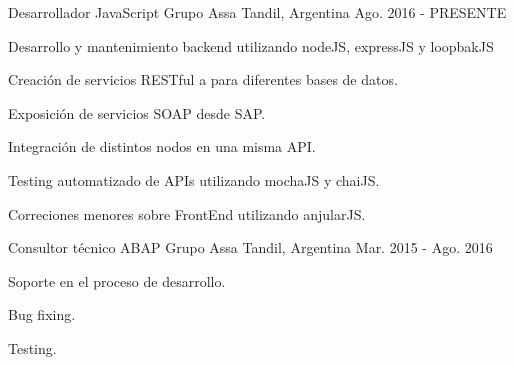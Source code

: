 


\begin{cventries}


\cventry
{Desarrollador JavaScript} %
{Grupo Assa} %
{Tandil, Argentina} %
{Ago. 2016 - PRESENTE} %
{ %
\begin{cvitems}
\item {Desarrollo y mantenimiento backend utilizando nodeJS, expressJS y loopbakJS}
\item {Creación de servicios RESTful a para diferentes bases de datos.}
\item {Exposición de servicios SOAP desde SAP.}
\item {Integración de distintos nodos en una misma API.}
\item {Testing automatizado de APIs utilizando mochaJS y chaiJS.}
\item {Correciones menores sobre FrontEnd utilizando anjularJS.}
\end{cvitems}
}

\cventry
{Consultor técnico ABAP} %
{Grupo Assa} %
{Tandil, Argentina} %
{Mar. 2015 - Ago. 2016} %
{ %
\begin{cvitems}
\item {Soporte en el proceso de desarrollo.}
\item {Bug fixing.}
\item {Testing.}
\end{cvitems}
}

\end{cventries}
